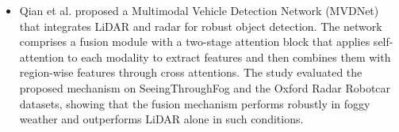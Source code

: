 \documentclass[rnd]{mas_proposal}
\begin{document}
\begin{itemize}
      \item Qian et al. \cite{qian2021robust} proposed a Multimodal Vehicle Detection Network (MVDNet) that integrates LiDAR and radar for robust object detection. The network comprises a fusion module with a two-stage attention block that applies self-attention to each modality to extract features and then combines them with region-wise features through cross attentions. The study evaluated the proposed mechanism on SeeingThroughFog \cite{bijelic2020seeing} and the Oxford Radar Robotcar \cite{barnes2020oxford} datasets, showing that the fusion mechanism performs robustly in foggy weather and outperforms LiDAR alone in such conditions.
      

\end{itemize}
\end{document}
